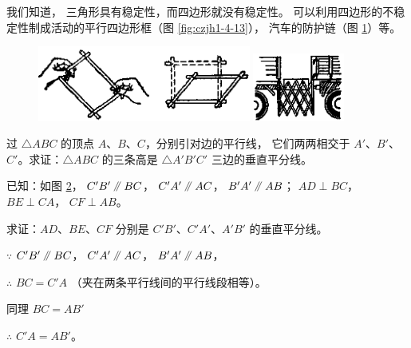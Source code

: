 我们知道， 三角形具有稳定性，而四边形就没有稳定性。
可以利用四边形的不稳定性制成活动的平行四边形框（图 \ref{fig:czjh1-4-13}），
汽车的防护链（图 \ref{fig:czjh1-4-14}）等。

\begin{figure}[htbp]
    \centering
    \begin{minipage}[b]{8cm}
        \centering
        \includegraphics[width=7cm]{../pic/czjh1-ch4-13.png}
        \caption{}\label{fig:czjh1-4-13}
    \end{minipage}
    \qquad
    \begin{minipage}[b]{6cm}
        \centering
        \includegraphics[width=3cm]{../pic/czjh1-ch4-14.png}
        \caption{}\label{fig:czjh1-4-14}
    \end{minipage}
\end{figure}



\begin{figure}
    \centering
    
    \caption{}\label{fig:czjh1-4-15}
\end{figure}

\liti 过 $\triangle ABC$ 的顶点 $A$、$B$、$C$，分别引对边的平行线，
它们两两相交于 $A'$、$B'$、$C'$。求证：$\triangle ABC$ 的三条高是
$\triangle A'B'C'$ 三边的垂直平分线。

已知：如图 \ref{fig:czjh1-4-15}， $C'B' \pingxing BC$， $C'A' \pingxing AC$， $B'A' \pingxing AB$；
$AD \perp BC$， $BE \perp CA$， $CF \perp AB$。

求证：$AD$、$BE$、$CF$ 分别是 $C'B'$、$C'A'$、$A'B'$ 的垂直平分线。

\zhengming $\because$ \quad $C'B' \pingxing BC$， $C'A' \pingxing AC$， $B'A' \pingxing AB$，

$\therefore$ \quad $BC = C'A$ （夹在两条平行线间的平行线段相等）。

同理 \quad $BC = AB'$

$\therefore$ \quad $C'A = AB'$。

